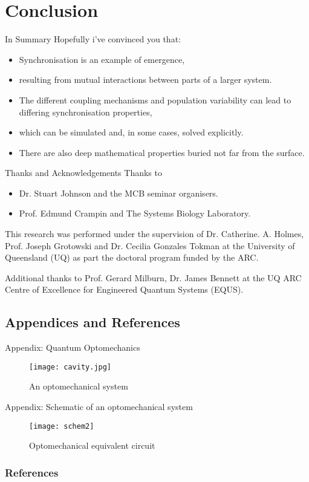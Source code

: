 \documentclass[10pt,reqno]{beamer}
\begin{document}
\section{Conclusion}
\begin{frame}{In Summary}
Hopefully i've convinced you that:
\begin{itemize}
	\item Synchronisation is an example of emergence,
	\item resulting from mutual interactions between parts of a larger system.
	\item The different coupling mechanisms and population variability can lead to differing synchronisation properties,
	\item which can be simulated and, in some cases, solved explicitly.
	\item There are also deep mathematical properties buried not far from the surface.
\end{itemize}
\end{frame}
\begin{frame}{Thanks and Acknowledgements}
Thanks to 
\begin{itemize}
	\item Dr. Stuart Johnson and the MCB seminar organisers.
	\item Prof. Edmund Crampin and The Systems Biology Laboratory.
\end{itemize}

This research was performed under the supervision of Dr. Catherine. A. Holmes, Prof. Joseph Grotowski and Dr. Cecilia Gonzales Tokman at the University of Queensland (UQ) as part the doctoral program funded by the ARC.
\vspace{12pt}

Additional thanks to Prof. Gerard Milburn, Dr. James Bennett at the UQ ARC Centre of Excellence for Engineered Quantum Systems (EQUS).
\end{frame}
\subsection{Appendices and References}
\begin{frame}{Appendix: Quantum Optomechanics}
\begin{figure}
\texttt{[image: cavity.jpg]}\caption{An optomechanical system~\cite{nanoimg}}
\end{figure}
\end{frame}
\begin{frame}{Appendix: Schematic of an optomechanical system}
\begin{figure}
	\texttt{[image: schem2]}\caption{Optomechanical equivalent circuit}
\end{figure}
\end{frame}
\begin{frame}[allowframebreaks]
\frametitle{References}
\tiny
\printbibliography
\end{frame}
\end{document}
